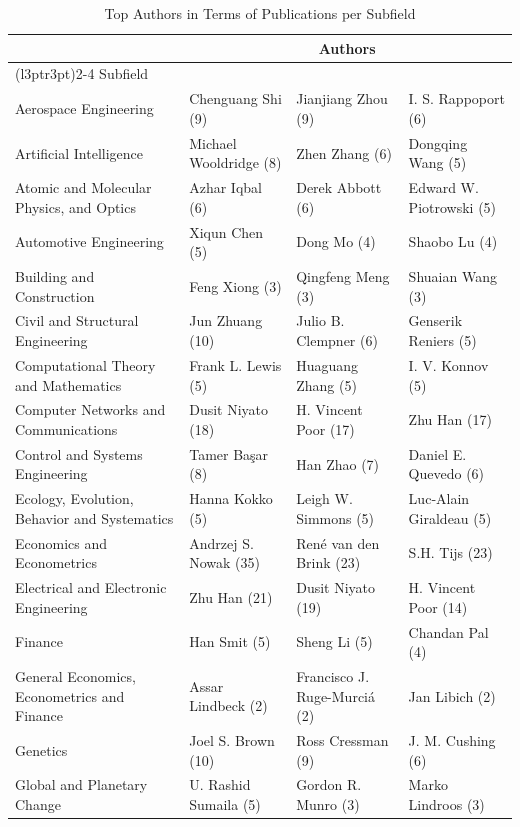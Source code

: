 \documentclass[
  12pt,
]{article}
\begin{document}
\begin{table}[H]

\caption{\label{tab:authors per subfield cont}Top Authors in Terms of Publications per Subfield}
\centering
\fontsize{8}{10}\selectfont
\begin{tabular}[t]{llll}
\toprule
\multicolumn{1}{c}{ } & \multicolumn{3}{c}{Authors} \\
\cmidrule(l{3pt}r{3pt}){2-4}
Subfield &  &  & \\
\midrule
Aerospace Engineering & Chenguang Shi (9) & Jianjiang Zhou (9) & I. S. Rappoport (6)\\
Artificial Intelligence & Michael Wooldridge (8) & Zhen Zhang (6) & Dongqing Wang (5)\\
Atomic and Molecular Physics, and Optics & Azhar Iqbal (6) & Derek Abbott (6) & Edward W. Piotrowski (5)\\
Automotive Engineering & Xiqun Chen (5) & Dong Mo (4) & Shaobo Lu (4)\\
Building and Construction & Feng Xiong (3) & Qingfeng Meng (3) & Shuaian Wang (3)\\
Civil and Structural Engineering & Jun Zhuang (10) & Julio B. Clempner (6) & Genserik Reniers (5)\\
Computational Theory and Mathematics & Frank L. Lewis (5) & Huaguang Zhang (5) & I. V. Konnov (5)\\
Computer Networks and Communications & Dusit Niyato (18) & H. Vincent Poor (17) & Zhu Han (17)\\
Control and Systems Engineering & Tamer Başar (8) & Han Zhao (7) & Daniel E. Quevedo (6)\\
Ecology, Evolution, Behavior and Systematics & Hanna Kokko (5) & Leigh W. Simmons (5) & Luc‐Alain Giraldeau (5)\\
Economics and Econometrics & Andrzej S. Nowak (35) & René van den Brink (23) & S.H. Tijs (23)\\
Electrical and Electronic Engineering & Zhu Han (21) & Dusit Niyato (19) & H. Vincent Poor (14)\\
Finance & Han Smit (5) & Sheng Li (5) & Chandan Pal (4)\\
General Economics, Econometrics and Finance & Assar Lindbeck (2) & Francisco J. Ruge-Murciá (2) & Jan Libich (2)\\
Genetics & Joel S. Brown (10) & Ross Cressman (9) & J. M. Cushing (6)\\
Global and Planetary Change & U. Rashid Sumaila (5) & Gordon R. Munro (3) & Marko Lindroos (3)\\

\end{tabular}
\end{table}
\end{document}

